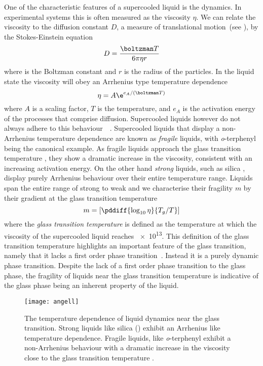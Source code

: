 One of the characteristic features of a supercooled liquid is the dynamics. In experimental systems this is often measured as the viscosity $\eta$. We can relate the viscosity to the diffusion constant $D$, a measure of translational motion~(see ), by the Stokes-Einstein equation~\cite{lubchenko:07}
\begin{equation}
    D = \frac{\boltzman T}{6\pi \eta r}
\end{equation}
where \boltzman{} is the Boltzman constant and $r$ is the radius of the particles. In the liquid state the viscosity will obey an Arrhenius type temperature dependence
\begin{equation}
    \eta = A \e^{e_A/(\boltzman T)}
\end{equation}
where $A$ is a scaling factor, $T$ is the temperature, and $e_A$ is the activation energy of the processes that comprise diffusion. Supercooled liquids however do not always adhere to this behaviour~~\cite{angell:91,angell:95,lubchenko:07}. Supercooled liquids that display a non-Arrhenius temperature dependence are known as \emph{fragile} liquids, with \emph{o}-terphenyl being the canonical example. As fragile liquids approach the glass transition temperature \si{\Tg}, they show a dramatic increase in the viscosity, consistent with an increasing activation energy. On the other hand \emph{strong} liquids, such as silica , display purely Arrhenius behaviour over their entire temperature range. Liquids span the entire range of strong to weak and we characterise their fragility $m$ by their gradient at the glass transition temperature
\begin{equation}
    m = \left [ \pddiff{\log_{10}\eta}{T_g/T} \right ]
\end{equation}
where the \emph{glass transition temperature} \si{\Tg} is defined as the temperature at which the viscosity of the supercooled liquid reaches \SI{e13}{\poise}. This definition of the glass transition temperature highlights an important feature of the glass transition, namely that it lacks a first order phase transition~\cite{santen:00}. Instead it is a purely dynamic phase transition. Despite the lack of a first order phase transition to the glass phase, the fragility of liquids near the glass transition temperature is indicative of the glass phase being an inherent property of the liquid.

\begin{figure}
    \centering
    \texttt{[image: angell]}
    \caption{The temperature dependence of liquid dynamics near the glass transition. Strong liquids like silica () exhibit an Arrhenius like temperature dependence. Fragile liquids, like {\em o}-terphenyl exhibit a non-Arrhenius behaviour with a dramatic increase in the viscosity close to the glass transition temperature \si{\Tg}.}
    \label{fig:angell}
\end{figure}

